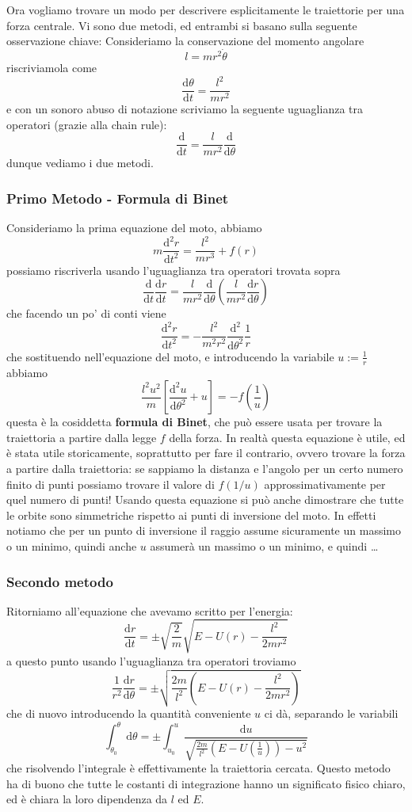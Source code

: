 \documentclass[11pt]{scrartcl}
\newcommand{\dif}{\text{d}}
\begin{document}
	Ora vogliamo trovare un modo per descrivere esplicitamente le traiettorie per una forza centrale. Vi sono due metodi, ed entrambi si basano sulla seguente osservazione chiave:
	Consideriamo la conservazione del momento angolare
	$$l=mr^2\dot{\theta}$$
	riscriviamola come
	$$\frac{\dif \theta}{\dif t}=\frac{l^2}{mr^2}$$
	e con un sonoro abuso di notazione scriviamo la seguente uguaglianza tra operatori (grazie alla chain rule):
	$$\boxed{\frac{\dif}{\dif t}=\frac{l}{mr^2}\frac{\dif }{\dif \theta}}$$
	dunque vediamo i due metodi.
	\subsubsection{Primo Metodo - Formula di Binet}
	Consideriamo la prima equazione del moto, abbiamo
	$$m\frac{\dif^2 r}{\dif t^2}=\frac{l^2}{mr^3}+f(r)$$
	possiamo riscriverla usando l'uguaglianza tra operatori trovata sopra
	$$\frac{\dif }{\dif t}\frac{\dif r}{\dif t}=\frac{l}{mr^2}\frac{\dif}{\dif \theta}\left(\frac{l}{mr^2}\frac{\dif r}{\dif \theta}\right)$$
	che facendo un po' di conti viene
	$$\frac{\dif^2r}{\dif t^2}=-\frac{l^2}{m^2r^2}\frac{\dif^2}{\dif\theta^2}\frac{1}{r}$$
	che sostituendo nell'equazione del moto, e introducendo la variabile $u:=\frac{1}{r}$ abbiamo
	$$\frac{l^2 u^2}{m}\left[\frac{\dif^2 u}{\dif \theta^2}+u\right]=-f\left(\frac{1}{u}\right)$$
	questa è la cosiddetta \textbf{formula di Binet}, che può essere usata per trovare la traiettoria a partire dalla legge $f$ della forza. In realtà questa equazione è utile, ed è stata utile storicamente, soprattutto per fare il contrario, ovvero trovare la forza a partire dalla traiettoria: se sappiamo la distanza e l'angolo per un certo numero finito di punti possiamo trovare il valore di $f(1/u)$ approssimativamente per quel numero di punti! Usando questa equazione si può anche dimostrare che tutte le orbite sono simmetriche rispetto ai punti di inversione del moto. In effetti notiamo che per un punto di inversione il raggio assume sicuramente un massimo o un minimo, quindi anche $u$ assumerà un massimo o un minimo, e quindi \dots
	
	\subsubsection{Secondo metodo}
	
	Ritorniamo all'equazione che avevamo scritto per l'energia:
	$$\frac{\dif r}{\dif t}=\pm \sqrt{\frac{2}{m}}\sqrt{E-U(r)-\frac{l^2}{2mr^2}}$$
	a questo punto usando l'uguaglianza tra operatori troviamo
	$$\frac{1}{r^2}\frac{\dif r}{\dif \theta}=\pm \sqrt{\frac{2m}{l^2}\left(E-U(r)-\frac{l^2}{2mr^2}\right)}$$
	che di nuovo introducendo la quantità conveniente $u$ ci dà, separando le variabili
	$$\int_{\theta_0}^\theta\dif \theta=\pm\int_{u_0}^u\frac{\dif u}{\sqrt{\frac{2m}{l^2}\left(E-U\left(\frac{1}{u}\right)\right)-u^2}}$$
	che risolvendo l'integrale è effettivamente la traiettoria cercata. Questo metodo ha di buono che tutte le costanti di integrazione hanno un significato fisico chiaro, ed è chiara la loro dipendenza da $l$ ed $E$.
	
\end{document}
